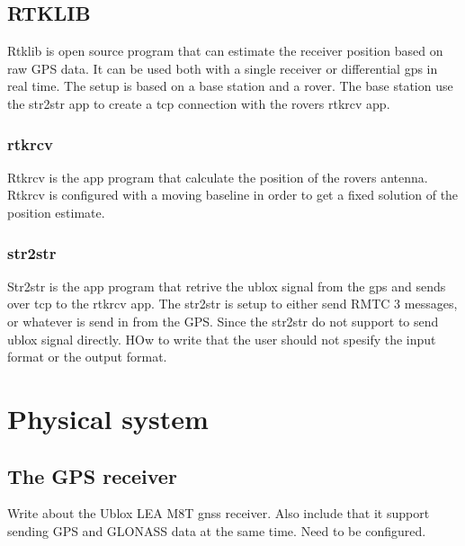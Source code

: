 \subsection{RTKLIB}
Rtklib is open source program that can estimate the receiver position based on raw GPS data. It can be used both with a single receiver or differential gps in real time. The setup is based on a base station and a rover. The base station use the str2str app to create a tcp connection with the rovers rtkrcv app.
\subsubsection{rtkrcv}
Rtkrcv is the app program that calculate the position of the rovers antenna. Rtkrcv is configured with a moving baseline in order to get a fixed solution of the position estimate.
\subsubsection{str2str}
Str2str is the app program that retrive the ublox signal from the gps and sends over tcp to the rtkrcv app. The str2str is setup to either send RMTC 3 messages, or whatever is send in from the GPS. Since the str2str do not support to send ublox signal directly. HOw to write that the user should not spesify the input format or the output format.
\section{Physical system}
\subsection{The GPS receiver}
Write about the Ublox LEA M8T gnss receiver. Also include that it support sending GPS and GLONASS data at the same time. Need to be configured.
\cleardoublepage